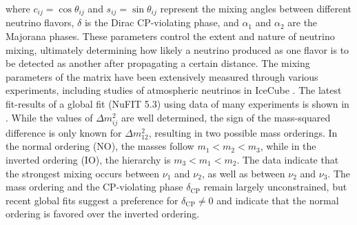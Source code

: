 where $c_{ij} = \cos\theta_{ij}$ and $s_{ij} = \sin\theta_{ij}$ represent the mixing angles between different neutrino flavors, $\delta$ is the Dirac CP-violating phase, and $\alpha_1$ and $\alpha_2$ are the Majorana phases. These parameters control the extent and nature of neutrino mixing, ultimately determining how likely a neutrino produced as one flavor is to be detected as another after propagating a certain distance. The mixing parameters of the matrix have been extensively measured through various experiments, including studies of atmospheric neutrinos in IceCube . The latest fit-results of a global fit (NuFIT 5.3)  using data of many experiments is shown in . While the values of $\Delta m^2_{ij}$ are well determined, the sign of the mass-squared difference is only known for $\Delta m^2_{12}$, resulting in two possible mass orderings. In the normal ordering (NO), the masses follow $m_1 < m_2 < m_3$, while in the inverted ordering (IO), the hierarchy is $m_3 < m_1 < m_2$. The data indicate that the strongest mixing occurs between $\nu_1$ and $\nu_2$, as well as between $\nu_2$ and $\nu_3$. The mass ordering and the CP-violating phase $\delta_{\text{CP}}$ remain largely unconstrained, but recent global fits suggest a preference for $\delta_{\text{CP}} \neq 0$ and indicate that the normal ordering is favored over the inverted ordering.

